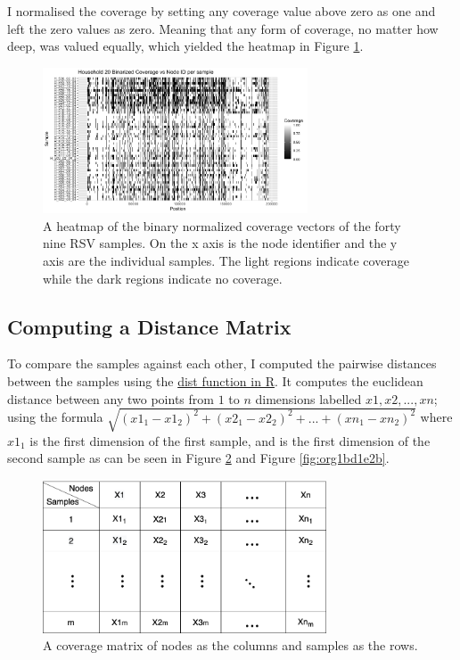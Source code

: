 \documentclass[10pt, a4paper]{article}
\begin{document}
I normalised the coverage by setting any coverage value above zero as one and
left the zero values as zero. Meaning that any form of coverage, no matter how
deep, was valued equally, which yielded the heatmap in Figure \ref{fig:org05c26df}.

\begin{figure}[h!]
\centering
\includegraphics[width=0.7\textwidth]{../Figures/RSV/Heatmap.png}
\caption[RSV heatmap]{\label{fig:org05c26df}A heatmap of the binary normalized coverage vectors of the forty nine RSV samples. On the x axis is the node identifier and the y axis are the individual samples. The light regions indicate coverage while the dark regions indicate no coverage.}
\end{figure}

\newpage
\subsection{Computing a Distance Matrix}
\label{sec:orgec5bb3e}

To compare the samples against each other, I computed the pairwise distances
between the samples using the \href{https://www.rdocumentation.org/packages/stats/versions/3.6.2/topics/dist}{dist function in R}. It computes the euclidean
distance between any two points from \(1\) to \(n\) dimensions labelled
\(x1, x2, ... ,xn\);
using the formula \(\sqrt{(x1_1- x1_2)^2 + (x2_1- x2_2)^2 + ... + (xn_1- xn_2)^2}\) where
\(x1_1\) is the first dimension of the first sample, and
is the first dimension of the second sample as can be seen in
Figure \ref{fig:org355e268} and Figure \ref{fig:org1bd1e2b}.

\begin{figure}
\centering
\includegraphics[width=0.75\textwidth]{../Figures/Methods/Coverage_Matrix.png}
\caption[Coverage Matrix]{\label{fig:org355e268}A coverage matrix of nodes as the columns and samples as the rows.}
\end{figure}
\end{document}
